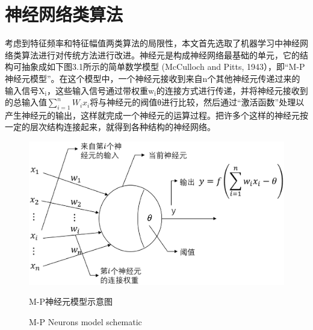 \section{神经网络类算法}
\indent 考虑到特征频率和特征幅值两类算法的局限性，本文首先选取了机器学习中神经网络类算法进行对传统方法进行改进。神经元是构成神经网络最基础的单元，它的结构可抽象成如下图3.1所示的简单数学模型 (McCulloch and Pitts, 1943），即“M-P神经元模型”。在这个模型中，一个神经元接收到来自n个其他神经元传递过来的输入信号$\mathrm{X}_{\mathrm{i}}$，这些输入信号通过带权重$\mathrm{w}_{\mathrm{i}}$的连接方式进行传递，并将神经元接收到的总输入值$\sum_{i=1}^{n} W_{i} x_{i}$将与神经元的阀值θ进行比较，然后通过“激活函数”处理以产生神经元的输出，这样就完成一个神经元的运算过程。把许多个这样的神经元按一定的层次结构连接起来，就得到各种结构的神经网络。\\
\begin{figure}[!h] 
\centering 
 \includegraphics[width=0.85\linewidth]{img/mp.eps} 
 \renewcommand{\figurename}{图} 
\caption{M-P神经元模型示意图} 
\addtocounter{figure}{-1} \vspace{-5pt} 
\renewcommand{\figurename}{Fig} 
\caption{M-P Neurons model schematic} 
\renewcommand{\figurename}{图} 
\label{fig:network-device-influence.png} 
\end{figure}
